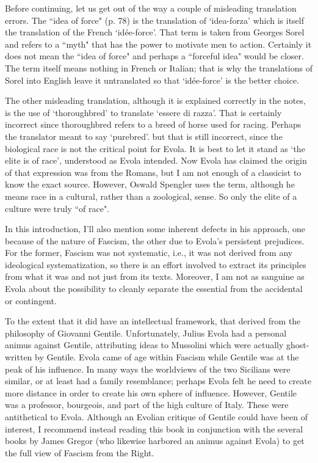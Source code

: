 Before continuing, let us get out of the way a couple of misleading translation errors. The ``idea of force" (p. 78) is the translation of `idea-forza' which is itself the translation of the French `idée-force'. That term is taken from Georges Sorel and refers to a ``myth" that has the power to motivate men to action. Certainly it does not mean the ``idea of force" and perhaps a ``forceful idea" would be closer. The term itself means nothing in French or Italian; that is why the translations of Sorel into English leave it untranslated so that `idée-force' is the better choice.

The other misleading translation, although it is explained correctly in the notes, is the use of `thoroughbred' to translate `essere di razza'. That is certainly incorrect since thoroughbred refers to a breed of horse used for racing. Perhaps the translator meant to say `purebred'. but that is still incorrect, since the biological race is not the critical point for Evola. It is best to let it stand as `the elite is of race', understood as Evola intended. Now Evola has claimed the origin of that expression was from the Romans, but I am not enough of a classicist to know the exact source. However, Oswald Spengler uses the term, although he means race in a cultural, rather than a zoological, sense. So only the elite of a culture were truly ``of race".

In this introduction, I'll also mention some inherent defects in his approach, one because of the nature of Fascism, the other due to Evola's persistent prejudices. For the former, Fascism was not systematic, i.e., it was not derived from any ideological systematization, so there is an effort involved to extract its principles from what it was and not just from its texts. Moreover, I am not as sanguine as Evola about the possibility to cleanly separate the essential from the accidental or contingent.

To the extent that it did have an intellectual framework, that derived from the philosophy of Giovanni Gentile. Unfortunately, Julius Evola had a personal animus against Gentile, attributing ideas to Mussolini which were actually ghost-written by Gentile. Evola came of age within Fascism while Gentile was at the peak of his influence. In many ways the worldviews of the two Sicilians were similar, or at least had a family resemblance; perhaps Evola felt he need to create more distance in order to create his own sphere of influence. However, Gentile was a professor, bourgeois, and part of the high culture of Italy. These were antithetical to Evola. Although an Evolian critique of Gentile could have been of interest, I recommend instead reading this book in conjunction with the several books by James Gregor (who likewise harbored an animus against Evola) to get the full view of Fascism from the Right.


